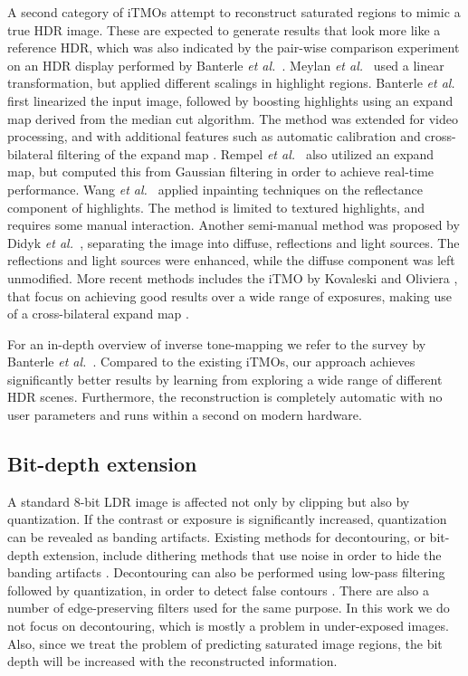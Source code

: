 \documentclass[acmtog]{acmart}
\newcommand{\etal}{\emph{et al.\ }}
\newcommand\customsection[1]{\subsection{#1}}
\begin{document}
A second category of iTMOs attempt to reconstruct saturated regions to mimic a true HDR image. These are expected to generate results that look more like a reference HDR, which was also indicated by the pair-wise comparison experiment on an HDR display performed by Banterle \etal \citeyear{Banterle2009}. 
Meylan \etal \citeyear{Meylan2006} used a linear transformation, but applied different scalings in highlight regions. Banterle \etal \citeyear{Banterle2006} first linearized the input image, followed by boosting highlights using an expand map derived from the median cut algorithm. The method was extended for video processing, and with additional features such as automatic calibration and cross-bilateral filtering of the expand map \cite{Banterle2008}. Rempel \etal \citeyear{Rempel2007} also utilized an expand map, but computed this from Gaussian filtering in order to achieve real-time performance. Wang \etal \citeyear{Wang2007} applied inpainting techniques on the reflectance component of highlights. The method is limited to textured highlights, and requires some manual interaction. Another semi-manual method was proposed by Didyk \etal \citeyear{Didyk2008}, separating the image into diffuse, reflections and light sources. The reflections and light sources were enhanced, while the diffuse component was left unmodified. More recent methods includes the iTMO by Kovaleski and Oliviera \citeyear{Kovaleski2014}, that focus on achieving good results over a wide range of exposures, making use of a cross-bilateral expand map \cite{Kovaleski2009}.

For an in-depth overview of inverse tone-mapping we refer to the survey by Banterle \etal \citeyear{Banterle2009b}. Compared to the existing iTMOs, our approach achieves significantly better results by learning from exploring a wide range of different HDR scenes.
Furthermore, the reconstruction is completely automatic with no user parameters and runs within a second on modern hardware.

\customsection{Bit-depth extension}
A standard 8-bit LDR image is affected not only by clipping but also by quantization. If the contrast or exposure is significantly increased, quantization can be revealed as banding artifacts. Existing methods for decontouring, or bit-depth extension, include dithering methods that use noise in order to hide the banding artifacts \cite{Daly2003}. Decontouring can also be performed using low-pass filtering followed by quantization, in order to detect false contours \cite{Daly2004}. There are also a number of edge-preserving filters used for the same purpose. In this work we do not focus on decontouring, which is mostly a problem in under-exposed images. Also, since we treat the problem of predicting saturated image regions, the bit depth will be increased with the reconstructed information.
\end{document}
